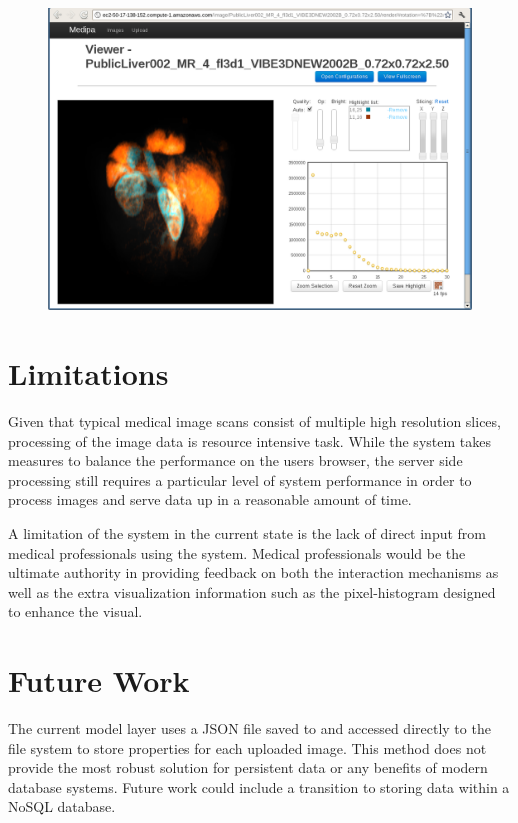 \documentclass[annual]{acmsiggraph}
\begin{document}
\begin{figure}[htb]
\includegraphics[scale=0.475]{kidneys.png}
\label{Medipa System Architecture}
\end{figure}

\section{Limitations}
Given that typical medical image scans consist of multiple high resolution slices, processing of the image data is resource intensive task.  While the system takes measures to balance the performance on the users browser, the server side processing still requires a particular level of system performance in order to process images and serve data up in a reasonable amount of time.

A limitation of the system in the current state is the lack of direct input from medical professionals using the system.  Medical professionals would be the ultimate authority in providing feedback on both the interaction mechanisms as well as the extra visualization information such as the pixel-histogram designed to enhance the visual.		

\section{Future Work} 
The current model layer uses a JSON file saved to and accessed directly to the file system to store properties for each uploaded image.  This method does not provide the most robust solution for persistent data or any benefits of modern database systems.  Future work could include a transition to storing data within a NoSQL database.
\end{document}
